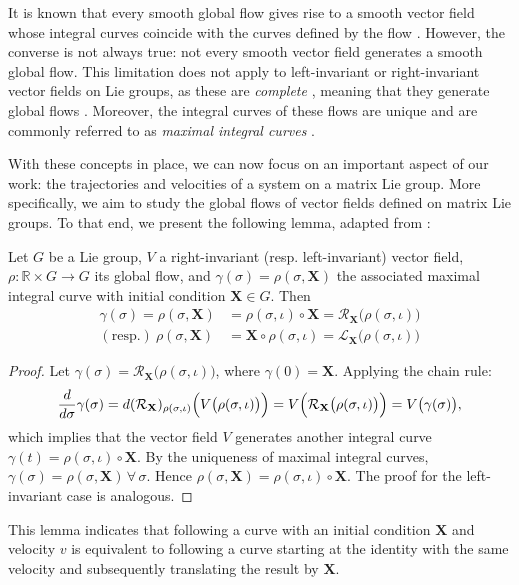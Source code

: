 It is known that every smooth global flow gives rise to a smooth vector field whose integral curves coincide with the curves defined by the flow \citep[p. 211]{Lee2012}. However, the converse is not always true: not every smooth vector field generates a smooth global flow. This limitation does not apply to left-invariant or right-invariant vector fields on Lie groups, as these are \emph{complete} \citep[p. 570]{Gallier2020}, meaning that they generate global flows \citep[p. 215]{Lee2012}. Moreover, the integral curves of these flows are unique \citep[p. 18]{Duistermaat2012} and are commonly referred to as \emph{maximal integral curves} \citep[p. 570]{Gallier2020}.

With these concepts in place, we can now focus on an important aspect of our work: the trajectories and velocities of a system on a matrix Lie group. More specifically, we aim to study the global flows of vector fields defined on matrix Lie groups. To that end, we present the following lemma, adapted from \citet[p. 570]{Gallier2020}:
\begin{lemma}\label{lemma:lie-group-flow}
    Let $G$ be a Lie group, $V$ a right-invariant (resp. left-invariant) vector field, $\rho:\mathbb{R}\times G\to G$ its global flow, and $\gamma(\sigma)=\rho(\sigma, \mathbf{X})$ the associated maximal integral curve with initial condition $\mathbf{X}\in G$. Then
    \begin{align*}
        \gamma(\sigma) = \rho(\sigma, \mathbf{X}) &=  \rho(\sigma, \iota)\circ\mathbf{X} = \mathcal{R}_\mathbf{X}\bigl(\rho(\sigma, \iota)\bigr)\\
        (\text{resp.})\ \rho(\sigma, \mathbf{X}) &=  \mathbf{X}\circ\rho(\sigma, \iota) = \mathcal{L}_\mathbf{X}\bigl(\rho(\sigma, \iota)\bigr)
    \end{align*}
\end{lemma}
\begin{proof}
    Let $\gamma(\sigma) = \mathcal{R}_\mathbf{X}\bigl(\rho(\sigma, \iota)\bigr)$, where $\gamma(0) = \mathbf{X}$. Applying the chain rule:
    \begin{align}
        \frac{d}{d\sigma}\gamma(\sigma) = d(\mathcal{R}_{\mathbf{X}})_{\rho(\sigma, \iota)}\Bigl(V\bigl(\rho(\sigma, \iota)\bigr)\Bigr) = V\Bigl(\mathcal{R}_{\mathbf{X}}\bigl(\rho(\sigma, \iota)\bigr)\Bigr) = V\bigl(\gamma(\sigma)\bigr),
    \end{align}
    which implies that the vector field $V$ generates another integral curve $\gamma(t)=\rho(\sigma, \iota)\circ\mathbf{X}$. By the uniqueness of maximal integral curves, $\gamma(\sigma) = \rho(\sigma, \mathbf{X})\,\forall\, \sigma$. Hence $\rho(\sigma, \mathbf{X}) = \rho(\sigma, \iota)\circ\mathbf{X}$. The proof for the left-invariant case is analogous.
\end{proof}
This lemma indicates that following a curve with an initial condition $\mathbf{X}$ and velocity $v$ is equivalent to following a curve starting at the identity with the same velocity and subsequently translating the result by $\mathbf{X}$.

